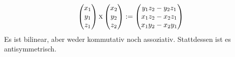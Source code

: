 \begin{example}
\begin{enumerate}[start=4]
		\[\begin{pmatrix}x_1\\y_1\\z_1\end{pmatrix} \textsc{x} \begin{pmatrix}x_2\\y_2\\z_2\end{pmatrix} := \begin{pmatrix}
			y_1 z_2 - y_2 z_1 \\
			x_1 z_2 - x_2 z_1 \\
			x_1 y_2 - x_2 y_1
		\end{pmatrix}\]
		Es ist bilinear, aber weder kommutativ noch assoziativ. Stattdessen ist es antisymmetrisch.
	\end{enumerate}
\end{example}
